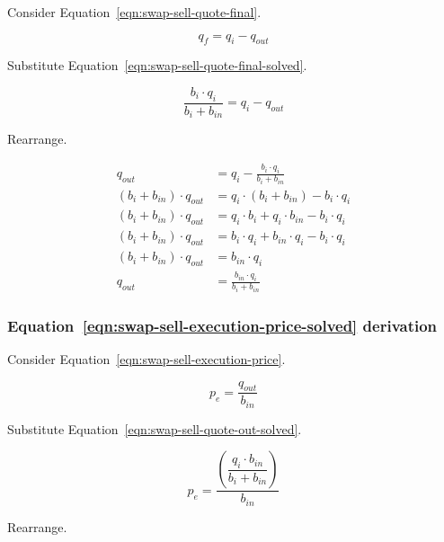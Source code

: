 \documentclass[table, twocolumn]{article}
\begin{document}
Consider Equation~\ref{eqn:swap-sell-quote-final}.

\begin{equation}
	q_f = q_i - q_{out} \nonumber
\end{equation}

Substitute Equation~\ref{eqn:swap-sell-quote-final-solved}.

\begin{equation}
	\frac{b_i \cdot q_i}{b_i + b_{in}}= q_i - q_{out} \nonumber
\end{equation}

Rearrange.

\begin{align}
	q_{out}                      & = q_i - \frac{b_i \cdot q_i}{b_i + b_{in}} \nonumber \\
	(b_i + b_{in}) \cdot q_{out} & = q_i \cdot (b_i + b_{in}) - b_i \cdot q_i \nonumber \\
	(b_i + b_{in}) \cdot q_{out} & =
	q_i \cdot b_i + q_i \cdot b_{in} - b_i \cdot q_i \nonumber                          \\
	(b_i + b_{in}) \cdot q_{out} & =
	b_i \cdot q_i + b_{in} \cdot q_i - b_i \cdot q_i \nonumber                          \\
	(b_i + b_{in}) \cdot q_{out} & = b_{in} \cdot q_i \nonumber                         \\
	q_{out}                      & = \frac{b_{in} \cdot q_i}{b_i + b_{in}} \nonumber
\end{align}

\subsubsection{Equation~\ref{eqn:swap-sell-execution-price-solved} derivation}%
\label{sssec:equation-eqn-swap-sell-execution-price-solved-derivation}

Consider Equation~\ref{eqn:swap-sell-execution-price}.

\begin{equation}
	p_e = \frac{q_{out}}{b_{in}} \nonumber
\end{equation}

Substitute Equation~\ref{eqn:swap-sell-quote-out-solved}.

\begin{equation}
	p_e = \dfrac{\left(\dfrac{q_i \cdot b_{in}}{b_i + b_{in}}\right)}{b_{in}} \nonumber
\end{equation}

Rearrange.
\end{document}

